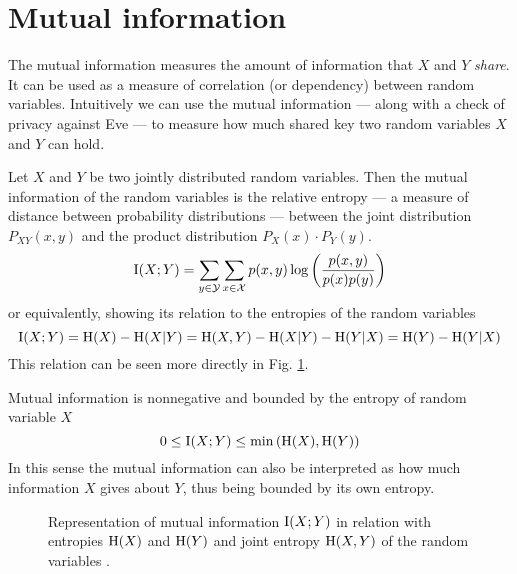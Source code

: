 \label{ch:four}
\section{Mutual information}\label{mutInfo}
	The mutual information measures the amount of information that $X$ and $Y$ \textit{share}.
    It can be used as a measure of correlation (or dependency) between random variables.
    Intuitively we can use the mutual information --- along with a check of privacy against Eve --- to measure how much shared key two random variables $X$ and $Y$ can hold.
    \begin{definition}
	Let $X$ and $Y$ be two jointly distributed random variables. Then the mutual information of the random variables is the relative entropy --- a measure of distance between probability distributions --- between the joint distribution $P_{XY}(x,y)$ and the product distribution $P_X(x)\cdot P_Y(y)$.
	\begin{equation}
		\operatorname{I}(X;Y) = \sum_{y\in\mathcal{Y}}\sum_{x\in\mathcal{X}} p(x,y) \log\left(\frac{p(x,y)}{p(x)p(y)}\right) 
	\end{equation}
	or equivalently, showing its relation to the entropies of the random variables
	\begin{equation}
		\operatorname{I}(X;Y) = \operatorname{H}(X) - \operatorname{H}(X|Y) = \operatorname{H}(X,Y) - \operatorname{H}(X|Y) - \operatorname{H}(Y|X) = \operatorname{H}(Y) - \operatorname{H}(Y|X)
	\end{equation}
	This relation can be seen more directly in Fig. \ref{fig:mutual_info}.
    \end{definition} 
	Mutual information is nonnegative and bounded by the entropy of random variable $X$
	\begin{equation}
		0 \leq \operatorname{I}(X;Y) \leq \min \left(\operatorname{H}(X), \operatorname{H}(Y)\right)
	\end{equation}
	In this sense the mutual information can also be interpreted as how much information $X$ gives about $Y$, thus being bounded by its own entropy.
	\begin{figure}[ht]
		\centering
		
		\caption{Representation of mutual information $\operatorname{I}(X;Y)$ in relation with entropies $\operatorname{H}(X)$ and $\operatorname{H}(Y)$ and joint entropy $\operatorname{H}(X,Y)$ of the random variables .
		\label{fig:mutual_info}}
	\end{figure}	
	
